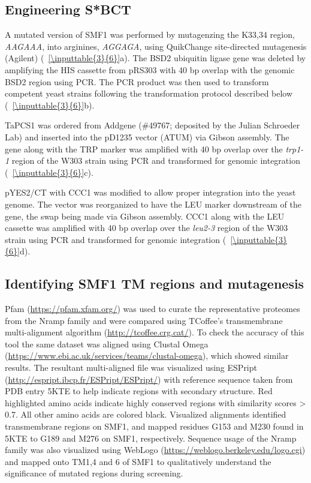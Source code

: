 \documentclass[../main/main]{subfiles}
\begin{document}
\subsection*{Engineering S*BCT}
A mutated version of SMF1 was performed by mutagenzing the K33,34 region, \textit{AAGAAA}, into arginines, \textit{AGGAGA}, using QuikChange site-directed mutagenesis (Agilent) (\sTABLE~\ref{\inputtable{3}{6}}a). The BSD2 ubiquitin ligase gene was deleted by amplifying the HIS cassette from pRS303 with 40 bp overlap with the genomic BSD2 region using PCR. The PCR product was then used to transform competent yeast strains following the transformation protocol described below (\sTABLE~\ref{\inputtable{3}{6}}b).

TaPCS1 was ordered from Addgene (\#{}49767; deposited by the Julian Schroeder Lab) and inserted into the pD1235 vector (ATUM) via Gibson assembly. The gene along with the TRP marker was amplified with 40 bp overlap over the \textit{trp1-1} region of the W303 strain using PCR and transformed for genomic integration (\sTABLE~\ref{\inputtable{3}{6}}c).

pYES2/CT with CCC1 was modified to allow proper integration into the yeast genome. The vector was reorganized to have the LEU marker downstream of the gene, the swap being made via Gibson assembly. CCC1 along with the LEU cassette was amplified with 40 bp overlap over the \textit{leu2-3} region of the W303 strain using PCR and transformed for genomic integration (\sTABLE~\ref{\inputtable{3}{6}}d).

\subsection*{Identifying SMF1 TM regions and mutagenesis}
Pfam (\url{https://pfam.xfam.org/}) was used to curate the representative proteomes from the Nramp family and were compared using TCoffee's transmembrane multi-alignment algorithm (\url{http://tcoffee.crg.cat/}). To check the accuracy of this tool the same dataset was aligned using Clustal Omega (\url{https://www.ebi.ac.uk/services/teams/clustal-omega}), which showed similar results. The resultant multi-aligned file was visualized using ESPript (\url{http://espript.ibcp.fr/ESPript/ESPript/}) with reference sequence taken from PDB entry 5KTE to help indicate regions with secondary structure. Red highlighted amino acids indicate highly conserved regions with similarity scores > 0.7. All other amino acids are colored black.  Visualized alignments identified transmembrane regions on SMF1, and mapped residues G153 and M230 found in 5KTE to G189 and M276 on SMF1, respectively. Sequence usage of the Nramp family was also visualized using WebLogo (\url{https://weblogo.berkeley.edu/logo.cgi}) and mapped onto TM1,4 and 6 of SMF1 to qualitatively understand the significance of mutated regions during screening.
\end{document}
